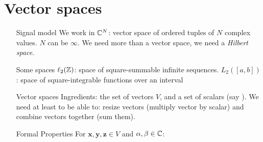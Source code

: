 \documentclass[11pt,a4paper]{article}
\begin{document}
\section{Vector spaces}
\begin{itemize}
	\item[Signal model]We work in $\mathbb{C}^N$: vector space  of ordered tuples of $N$ complex values. $N$ can be $\infty$. We need more than a vector space, we need a \textit{Hilbert space}.
	\item[Some spaces] $\ell_2(\mathbb{Z})$: space of square-summable infinite sequences. $L_2([a,b])$: space of square-integrable functions over an interval
	\item[Vector spaces]Ingredients: the set of vectors $V$, and a set of scalars (say \C). We need at least to be able to: resize vectors (multiply vector by scalar) and combine vectors together (sum them).
	\item[Formal Properties]For $\mathbf{x},\mathbf{y},\mathbf{z} \in V$ and $\alpha,\beta \in \mathbb{C}$:


\end{itemize}
\end{document}
